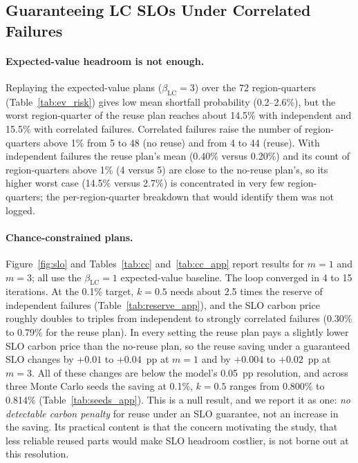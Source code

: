 \documentclass{article} %
\begin{document}
\subsection{Guaranteeing LC SLOs Under Correlated Failures}
\label{sec:slo}
\paragraph{Expected-value headroom is not enough.} Replaying the expected-value plans ($\beta_{\text{LC}}=3$) over the 72 region-quarters (Table~\ref{tab:ev_risk}) gives low mean shortfall probability (0.2--2.6\%), but the worst region-quarter of the reuse plan reaches about 14.5\% with independent and 15.5\% with correlated failures. Correlated failures raise the number of region-quarters above 1\% from 5 to 48 (no reuse) and from 4 to 44 (reuse). With independent failures the reuse plan's mean (0.40\% versus 0.20\%) and its count of region-quarters above 1\% (4 versus 5) are close to the no-reuse plan's, so its higher worst case (14.5\% versus 2.7\%) is concentrated in very few region-quarters; the per-region-quarter breakdown that would identify them was not logged.

\paragraph{Chance-constrained plans.} Figure~\ref{fig:slo} and Tables~\ref{tab:cc} and~\ref{tab:cc_app} report results for $m=1$ and $m=3$; all use the $\beta_{\text{LC}}=1$ expected-value baseline. The loop converged in 4 to 15 iterations. At the 0.1\% target, $k=0.5$ needs about 2.5 times the reserve of independent failures (Table~\ref{tab:reserve_app}), and the SLO carbon price roughly doubles to triples from independent to strongly correlated failures (0.30\% to 0.79\% for the reuse plan). In every setting the reuse plan pays a slightly lower SLO carbon price than the no-reuse plan, so the reuse saving under a guaranteed SLO changes by $+0.01$ to $+0.04$~pp at $m=1$ and by $+0.004$ to $+0.02$~pp at $m=3$. All of these changes are below the model's 0.05~pp resolution, and across three Monte Carlo seeds the saving at 0.1\%, $k=0.5$ ranges from 0.800\% to 0.814\% (Table~\ref{tab:seeds_app}). This is a null result, and we report it as one: \emph{no detectable carbon penalty} for reuse under an SLO guarantee, not an increase in the saving. Its practical content is that the concern motivating the study, that less reliable reused parts would make SLO headroom costlier, is not borne out at this resolution.
\end{document}
